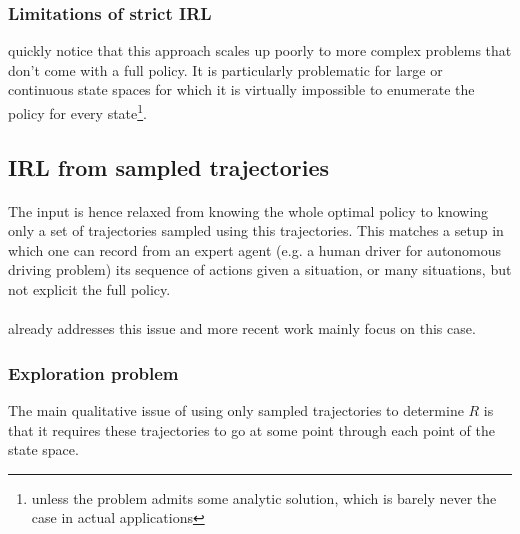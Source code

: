 \documentclass{article}
\begin{document}
\subsubsection{Limitations of strict IRL}

\cite{Ng00} quickly notice that this approach scales up poorly to more complex problems that don't come with a full policy. It is particularly problematic for large or continuous state spaces for which it is virtually impossible to enumerate the policy for every state\footnote{unless the problem admits some analytic solution, which is barely never the case in actual applications}.

\subsection{IRL from sampled trajectories}

\paragraph{}
The input is hence relaxed from knowing the whole optimal policy to knowing only a set of trajectories sampled using this trajectories. This matches a setup in which one can record from an expert agent (e.g. a human driver for autonomous driving problem) its sequence of actions given a situation, or many situations, but not explicit the full policy.

\paragraph{}
\cite{Ng00} already addresses this issue and more recent work mainly focus on this case.

\subsubsection{Exploration problem}
The main qualitative issue of using only sampled trajectories to determine $R$ is that it requires these trajectories to go at some point through each point of the state space.
\end{document}
